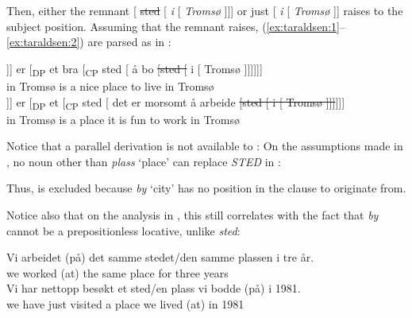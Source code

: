 \documentclass[output=paper]{LSP/langsci}
\begin{document}
Then, either the remnant [ \st{sted} [ \textit{i} [ \textit{Tromsø} ]]] or just [ \textit{i} [ \textit{Tromsø} ]] raises to the subject position. Assuming that the remnant raises, (\ref{ex:taraldsen:1}--\ref{ex:taraldsen:2}) are parsed as in :

\ea%
    \label{ex:taraldsen:54}

\ea \label{ex:taraldsen:54a}
\gll  [\st{sted} [ \textbf{i} [ \textbf{Tromsø} ]]] er [\textsubscript{DP} et bra [\textsubscript{CP} sted [ å bo       {\st{[sted [}} i [ Tromsø ]]]]]] \\
           {}    {}         in  {}  Tromsø  {}   is   {}    a nice   {}  place {} to live {} in {} Tromsø\\
\ex \label{ex:taraldsen:54b}
\gll  [\st{sted} [ \textbf{i} [ \textbf{Tromsø} ]]] er [\textsubscript{DP} et [\textsubscript{CP} sted [ det er morsomt   å arbeide \st{[sted [ i [ Tromsø ]]]}]]] \\
          {}     {}     in    {}    Tromsø     {}   is   {}                a       {}             place {}  it is  fun    to work    {\hspaceThis{\textit{[sted~[}} in  Tromsø} \\
\z
\z

Notice that a parallel derivation is not available to : On the assumptions made in , no noun other than \textit{plass} `place' can replace \textit{STED} in :

\ea%
    \label{ex:taraldsen:55}
\z
\z

Thus,  is excluded because \textit{by} `city' has no position in the  clause to originate from.

Notice also that on the analysis in , this still correlates with the fact that \textit{by} cannot be a prepositionless locative, unlike \textit{sted}:

\ea%
    \label{ex:taraldsen:56}
\ea
\gll  Vi arbeidet (på) {det samme stedet/den samme plassen} i tre år.\\
         we worked (at)  {the same place}                        for three years\\
\ex
\gll   Vi har nettopp besøkt {et sted/en plass} vi bodde (på) i 1981.\\
         we have just    visited {a  place}    we lived (at)  in 1981\\
\z
\z
\end{document}
